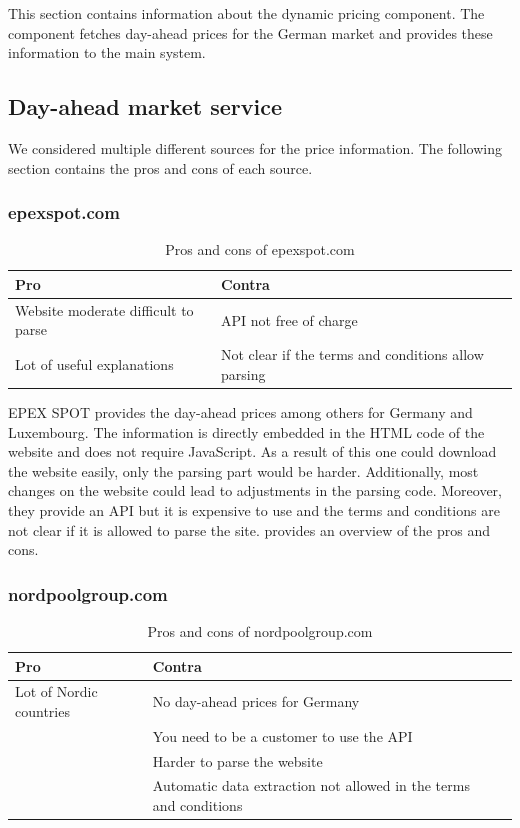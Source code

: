 This section contains information about the dynamic pricing component.
The component fetches day-ahead prices for the German market and provides these
information to the main system.

\subsection{Day-ahead market service}

We considered multiple different sources for the price information.
The following section contains the pros and cons of each source. 
\subsubsection{epexspot.com}

\begin{table}[!h]
	\centering
	\label{tab:epexspot}
	\begin{tabularx}{\textwidth}{ LLL }
		\toprule
		 Pro & Contra \\\midrule
		\tabitem Website moderate difficult to parse &\tabitem API not free of charge \cite{epexspot} \\
		 \tabitem Lot of useful explanations &\tabitem Not clear if the terms and conditions allow parsing \cite{epexspot}\\
		\bottomrule
	\end{tabularx}
	\caption{Pros and cons of epexspot.com}
\end{table}

EPEX SPOT provides the day-ahead prices among others for Germany and Luxembourg. 
The information is directly embedded in the HTML code of the website and does not require JavaScript. 
As a result of this one could download the website easily, only the parsing part would be harder.
Additionally, most changes on the website could lead to adjustments in the parsing code. 
Moreover, they provide an API but it is expensive to use and the terms and conditions are not clear if it is allowed to parse the site.
 provides an overview of the pros and cons.

\subsubsection{nordpoolgroup.com}

\begin{table}[!h]
	\centering
	\begin{tabularx}{\textwidth}{ LLL }
		\toprule
		Pro & Contra \\\midrule
	     \tabitem Lot of Nordic countries & \tabitem No day-ahead prices for Germany \cite{nord}\\
		 &\tabitem You need to be a customer to use the API \cite{nord}\\
		  &\tabitem Harder to parse the website\\
		 &\tabitem Automatic data extraction not allowed in the terms and conditions \cite{nord2}\\ 
		\bottomrule
	\end{tabularx}
	\caption{Pros and cons of nordpoolgroup.com}
	\label{tab:nordpoolgroup}
\end{table}

